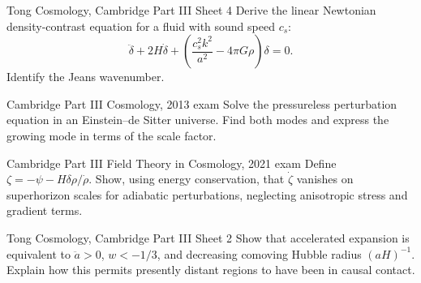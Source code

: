 \begin{exercises}
\begin{exercise}{Tong Cosmology, Cambridge Part III Sheet 4}
Derive the linear Newtonian density-contrast equation for a fluid with sound
speed \(c_s\):
\[
\ddot\delta+2H\dot\delta+
\left(\frac{c_s^2k^2}{a^2}-4\pi G\rho\right)\delta=0.
\]
Identify the Jeans wavenumber.
\end{exercise}

\begin{exercise}{Cambridge Part III Cosmology, 2013 exam}
Solve the pressureless perturbation equation in an Einstein--de Sitter
universe.  Find both modes and express the growing mode in terms of the scale
factor.
\end{exercise}

\begin{exercise}{Cambridge Part III Field Theory in Cosmology, 2021 exam}
Define
\(\zeta=-\psi-H\delta\rho/\dot\rho\).  Show, using energy conservation, that
\(\dot\zeta\) vanishes on superhorizon scales for adiabatic perturbations,
neglecting anisotropic stress and gradient terms.
\end{exercise}

\begin{exercise}{Tong Cosmology, Cambridge Part III Sheet 2}
Show that accelerated expansion is equivalent to
\(\ddot a>0\), \(w<-1/3\), and decreasing comoving Hubble radius
\((aH)^{-1}\).  Explain how this permits presently distant regions to have
been in causal contact.
\end{exercise}



\end{exercises}


